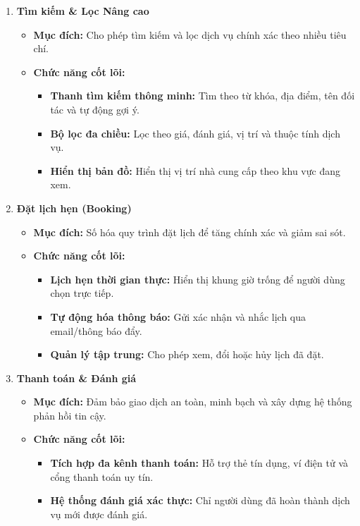 \begin{enumerate}
    \item \textbf{Tìm kiếm \& Lọc Nâng cao}
    \begin{itemize}
        \item \textbf{Mục đích:} Cho phép tìm kiếm và lọc dịch vụ chính xác theo nhiều tiêu chí.
        \item \textbf{Chức năng cốt lõi: } 
        \begin{itemize}
            \item \textbf{Thanh tìm kiếm thông minh:} Tìm theo từ khóa, địa điểm, tên đối tác và tự động gợi ý.
            \item  \textbf{Bộ lọc đa chiều:} Lọc theo giá, đánh giá, vị trí và thuộc tính dịch vụ.
            \item \textbf{Hiển thị bản đồ:} Hiển thị vị trí nhà cung cấp theo khu vực đang xem.
        \end{itemize}
    \end{itemize}
    \item \textbf{Đặt lịch hẹn (Booking)}
    \begin{itemize}
        \item \textbf{Mục đích:} Số hóa quy trình đặt lịch để tăng chính xác và giảm sai sót.
        \item \textbf{Chức năng cốt lõi:}
        \begin{itemize}
            \item \textbf{Lịch hẹn thời gian thực:} Hiển thị khung giờ trống để người dùng chọn trực tiếp.
            \item \textbf{Tự động hóa thông báo: }Gửi xác nhận và nhắc lịch qua email/thông báo đẩy.
            \item \textbf{Quản lý tập trung: }Cho phép xem, đổi hoặc hủy lịch đã đặt.
        \end{itemize}
    \end{itemize}
    \item \textbf{Thanh toán \& Đánh giá}
    \begin{itemize}
        \item \textbf{Mục đích:} Đảm bảo giao dịch an toàn, minh bạch và xây dựng hệ thống phản hồi tin cậy.
        \item \textbf{Chức năng cốt lõi:} 
        \begin{itemize}
            \item \textbf{Tích hợp đa kênh thanh toán:} Hỗ trợ thẻ tín dụng, ví điện tử và cổng thanh toán uy tín.
            \item \textbf{Hệ thống đánh giá xác thực:} Chỉ người dùng đã hoàn thành dịch vụ mới được đánh giá.

\end{itemize}
\end{itemize}
\end{enumerate}
